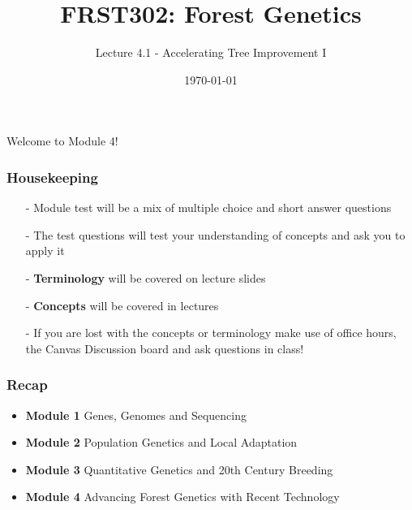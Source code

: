\documentclass[xcolor=dvipsnames]{beamer}
\title{\Huge FRST302: Forest Genetics}
\author{\Large Lecture 4.1 -  Accelerating Tree Improvement I}
\date{\today}
\begin{document}
	\maketitle

\begin{frame}
\Huge Welcome to Module 4!
\end{frame}


\begin{frame}
\frametitle{Housekeeping}
\begin{itemize}
	\item[-] Module test will be a mix of multiple choice and short answer questions
	\item[-] The test questions will test your understanding of concepts and ask you to apply it
	\item[-] \textbf{Terminology} will be covered on lecture slides
	\item[-] \textbf{Concepts} will be covered in lectures 
	\item[-] If you are lost with the concepts or terminology make use of office hours, the Canvas Discussion board and ask questions in class!
\end{itemize}
\end{frame}




	\begin{frame}
		\frametitle{Recap}
			
		\begin{itemize}
			\item{\textbf{Module 1}} Genes, Genomes and Sequencing
			\item{\textbf{Module 2}} Population Genetics and Local Adaptation
			\item{\textbf{Module 3}} Quantitative Genetics and 20th Century Breeding \pause
			\vspace{20pt}
					\item{\textbf{Module 4}} Advancing Forest Genetics with Recent Technology
				\end{itemize}
	\end{frame}
\end{document}
